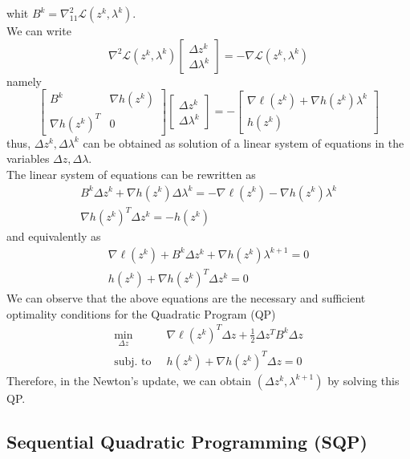 \documentclass[openany]{book}
\theoremstyle{definition}
\theoremstyle{remark}
\begin{document}
whit $B^k = \nabla_{11}^2 \mathcal{L}(z^k,\lambda^k)$.\\
We can write 
\[
    \nabla^2\mathcal{L}(z^k,\lambda^k)\begin{bmatrix}
        \Delta z^k \\ \Delta \lambda^k
    \end{bmatrix} = -\nabla \mathcal{L}(z^k,\lambda^k)
\]
namely 
\[
    \begin{bmatrix}
        B^k & \nabla h(z^k) \\
        \nabla h(z^k)^T & 0
        \end{bmatrix}  \begin{bmatrix}
        \Delta z^k \\ \Delta \lambda^k
        \end{bmatrix} = -\begin{bmatrix}
        \nabla \ell(z^k)+\nabla h(z^k)\lambda^k \\ h(z^k)
    \end{bmatrix}
\]
thus, $\Delta z^k, \Delta\lambda^k$ can be obtained as solution of a linear system of equations in the variables $\Delta z, \Delta\lambda$.\\
The linear system of equations can be rewritten as 
\begin{gather*}
    B^k\Delta z^k+\nabla h(z^k)\Delta \lambda^k = -\nabla\ell(z^k) - \nabla h(z^k)\lambda^k \\
    \nabla h(z^k)^T \Delta z^k = -h(z^k)
\end{gather*}
and equivalently as 
\begin{gather*}
    \nabla\ell(z^k) +B^k\Delta z^k+\nabla h(z^k)\lambda^{k+1} = 0 \\
    h(z^k)+\nabla h(z^k)^T\Delta z^k = 0
\end{gather*}
We can observe that the above equations are the necessary and sufficient optimality conditions for the Quadratic Program (QP)
\begin{align*}
    \min_{\Delta z}\  &\nabla\ell(z^k)^T\Delta z + \displaystyle\frac{1}{2}\Delta z^T B^k\Delta z \\
    \text{subj. to }\  & h(z^k) + \nabla h(z^k)^T \Delta z = 0
\end{align*}
Therefore, in the Newton's update, we can obtain $(\Delta z^k, \lambda^{k+1})$ by solving this QP.

\subsection{Sequential Quadratic Programming (SQP)}
\end{document}
